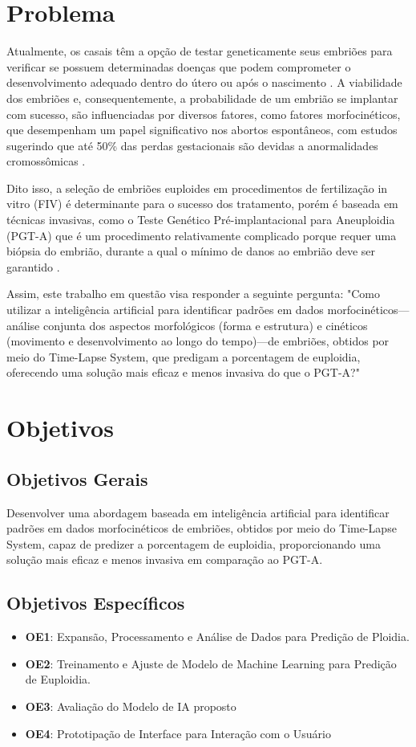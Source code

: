 \section{Problema}

Atualmente, os casais têm a opção de testar geneticamente seus embriões para verificar se possuem determinadas doenças que podem comprometer o desenvolvimento adequado dentro do útero ou após o nascimento \cite{scienceofbiogenetics2024}. A viabilidade dos embriões e, consequentemente, a probabilidade de um embrião se implantar com sucesso, são influenciadas por diversos fatores, como fatores morfocinéticos, que desempenham um papel significativo nos abortos espontâneos, com estudos sugerindo que até 50\% das perdas gestacionais são devidas a anormalidades cromossômicas \cite{scienceofbiogenetics2024}. 

Dito isso, a seleção de embriões euploides em procedimentos de fertilização in vitro (FIV) é determinante para o sucesso dos tratamento, porém é baseada em técnicas invasivas, como o Teste Genético Pré-implantacional para Aneuploidia (PGT-A) que é um procedimento relativamente complicado porque requer uma biópsia do embrião, durante a qual o mínimo de danos ao embrião deve ser garantido \cite{yang2024}. 

Assim, este trabalho em questão visa responder a seguinte pergunta: "Como utilizar a inteligência artificial para identificar padrões em dados morfocinéticos—análise conjunta dos aspectos morfológicos (forma e estrutura) e cinéticos (movimento e desenvolvimento ao longo do tempo)—de embriões, obtidos por meio do Time-Lapse System, que predigam a porcentagem de euploidia, oferecendo uma solução mais eficaz e menos invasiva do que o PGT-A?"


\section{Objetivos}

\subsection{Objetivos Gerais}
Desenvolver uma abordagem baseada em inteligência artificial para identificar padrões em dados morfocinéticos de embriões, obtidos por meio do Time-Lapse System, capaz de predizer a porcentagem de euploidia, proporcionando uma solução mais eficaz e menos invasiva em comparação ao PGT-A.

\subsection{Objetivos Específicos}
\begin{itemize}
    \item \textbf{OE1}: Expansão, Processamento e Análise de Dados para Predição de Ploidia.
    \item \textbf{OE2}: Treinamento e Ajuste de Modelo de Machine Learning para Predição de Euploidia.
    \item \textbf{OE3}: Avaliação do Modelo de IA proposto
    \item \textbf{OE4}: Prototipação de Interface para Interação com o Usuário
\end{itemize}

